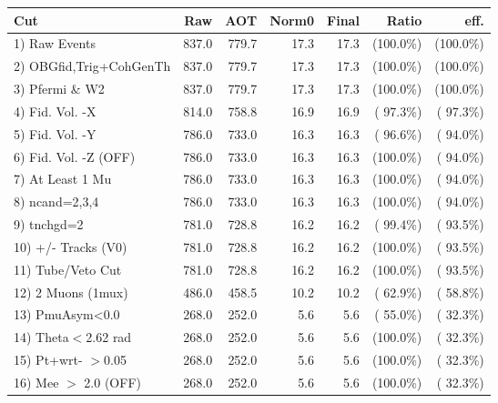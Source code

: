  \begin{table}[h!]\centering
 \begin{tabular}{||l||r|r|r|r|r|r||}
 \hline
 \hline
 Cut & Raw & AOT & Norm0 & Final & Ratio & eff.       \\
 \hline
  1) Raw Events           &        837.0 &        779.7 &         17.3 &         17.3 & (100.0\%) & (100.0\%) \\
  2) OBGfid,Trig+CohGenTh &        837.0 &        779.7 &         17.3 &         17.3 & (100.0\%) & (100.0\%) \\
  3) Pfermi \& W2         &        837.0 &        779.7 &         17.3 &         17.3 & (100.0\%) & (100.0\%) \\
  4) Fid. Vol. -X         &        814.0 &        758.8 &         16.9 &         16.9 & ( 97.3\%) & ( 97.3\%) \\
  5) Fid. Vol. -Y         &        786.0 &        733.0 &         16.3 &         16.3 & ( 96.6\%) & ( 94.0\%) \\
  6) Fid. Vol. -Z (OFF)   &        786.0 &        733.0 &         16.3 &         16.3 & (100.0\%) & ( 94.0\%) \\
  7) At Least 1 Mu        &        786.0 &        733.0 &         16.3 &         16.3 & (100.0\%) & ( 94.0\%) \\
  8) ncand=2,3,4          &        786.0 &        733.0 &         16.3 &         16.3 & (100.0\%) & ( 94.0\%) \\
  9) tnchgd=2             &        781.0 &        728.8 &         16.2 &         16.2 & ( 99.4\%) & ( 93.5\%) \\
 10) +/- Tracks (V0)      &        781.0 &        728.8 &         16.2 &         16.2 & (100.0\%) & ( 93.5\%) \\
 11) Tube/Veto Cut        &        781.0 &        728.8 &         16.2 &         16.2 & (100.0\%) & ( 93.5\%) \\
 12) 2 Muons (1mux)       &        486.0 &        458.5 &         10.2 &         10.2 & ( 62.9\%) & ( 58.8\%) \\
 13) PmuAsym<0.0          &        268.0 &        252.0 &          5.6 &          5.6 & ( 55.0\%) & ( 32.3\%) \\
 14) Theta$<$2.62 rad     &        268.0 &        252.0 &          5.6 &          5.6 & (100.0\%) & ( 32.3\%) \\
 15) Pt+wrt- $>$0.05      &        268.0 &        252.0 &          5.6 &          5.6 & (100.0\%) & ( 32.3\%) \\
 16) Mee $>$ 2.0  (OFF)   &        268.0 &        252.0 &          5.6 &          5.6 & (100.0\%) & ( 32.3\%) \\

\end{tabular}
\end{table}
